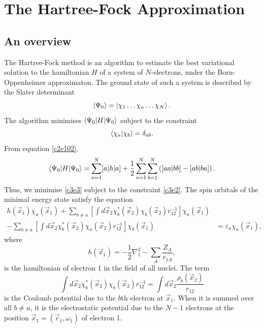 \chapter{The Hartree-Fock Approximation}\label{c3}
\section{An overview}\label{c3s1}
The Hartree-Fock method is an algorithm to estimate the best variational 
solution to the hamiltonian $H$ of a system of $N$-electrons, under the 
Born-Oppenheimer approximaton. The ground state of such a system is described 
by the Slater determinant
\begin{equation}\label{c3e1}
\ket{\Psi_0} = \ket{\chi_1\ldots\chi_a\ldots\chi_N}.
\end{equation}
The algorithm minimises $\braket{\Psi_0|H|\Psi_0}$ subject to the constraint
\begin{equation}\label{c3e2}
\braket{\chi_a|\chi_b} = \delta_{ab}.
\end{equation}
From equation \eqref{c2e102},
\begin{equation}\label{c3e3}
\braket{\Psi_0|H|\Psi_0} = \sum_{a=1}^N[a|h|a] + \frac{1}{2}\sum_{a=1}^N
\sum_{b=1}^N\left([aa|bb] - [ab|ba]\right).
\end{equation}
Thus, we minimise \eqref{c3e3} subject to the constraint \eqref{c3e2}. The
spin orbitals of the minimal energy state satisfy the equation
\begin{equation}\label{c3e4}
\begin{aligned}
h(\vec{x}_1)\chi_a(\vec{x}_1) + 
\sum_{b\ne a}\left[\int d\vec{x}_2\chi_b^\ast(\vec{x}_2)\chi_b(\vec{x}_2)
r_{12}^{-1}\right]\chi_a(\vec{x}_1)& \\
 - \sum_{b\ne a}\left[\int d\vec{x}_2\chi_b^\ast(\vec{x}_2)\chi_a(\vec{x}_2)
r_{12}^{-1}\right]\chi_b(\vec{x}_1) 
& = \varepsilon_a\chi_a(\vec{x}_1),
\end{aligned}
\end{equation}
where
\begin{equation}\label{c3e5}
h(\vec{x}_1) = -\frac{1}{2}\nabla_1^2 - \sum_A\frac{Z_A}{r_{1A}},
\end{equation}
is the hamiltonian of electron 1 in the field of all nuclei. The term
\[
\int d\vec{x}_2\chi_b^\ast(\vec{x}_2)\chi_b(\vec{x}_2)r_{12}^{-1} =
\int d\vec{x}_2\frac{\rho_b(\vec{x}_2)}{r_{12}}
\]
is the Coulomb potential due to the $b$th electron at $\vec{x}_1$. When it is
summed over all $b \ne a$, it is the electrostatic potential due to the $N-1$
electrons at the position $\vec{x}_1 = (\vec{r}_1, \omega_1)$ of electron 1.
